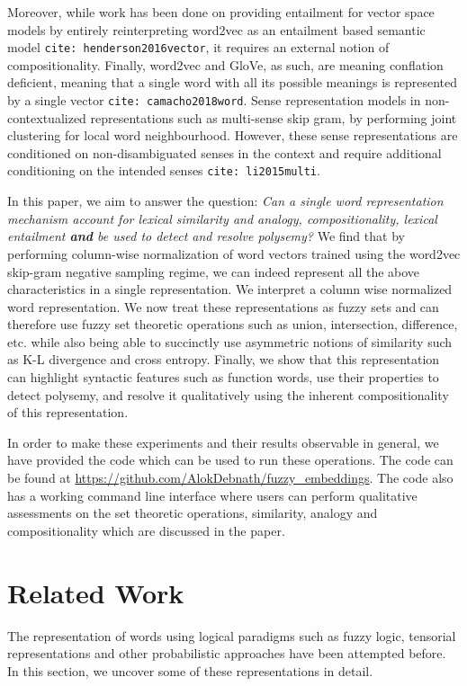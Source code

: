 \documentclass[11pt]{book}
\newcommand{\citep}[1]{\texttt{cite: #1}}
\begin{document}
Moreover, while work has been done on providing entailment for vector space
models by entirely reinterpreting word2vec as an entailment based semantic
model \citep{henderson2016vector}, it requires an external notion of
compositionality. Finally, word2vec and GloVe, as such, are meaning conflation
deficient, meaning that a single word with all its possible meanings is
represented by a single vector \citep{camacho2018word}. Sense representation
models in non-contextualized representations such as multi-sense skip gram, by
performing joint clustering for local word neighbourhood. However, these sense
representations are conditioned on non-disambiguated senses in the context and
require additional conditioning on the intended senses \citep{li2015multi}. 

In this paper, we aim to answer the question: \textit{Can a single word
representation mechanism account for lexical similarity and analogy,
compositionality, lexical entailment \textbf{and} be used to detect and resolve
polysemy?} We find that by performing column-wise normalization of word vectors
trained using the word2vec skip-gram negative sampling regime, we can indeed
represent all the above characteristics in a single representation. We
interpret a column wise normalized word representation. We now treat these
representations as fuzzy sets and can therefore use fuzzy set theoretic
operations such as union, intersection, difference, etc. while also being able
to succinctly use asymmetric notions of similarity such as K-L divergence and
cross entropy. Finally, we show that this representation can highlight
syntactic features such as function words, use their properties to detect
polysemy, and resolve it qualitatively using the inherent compositionality of
this representation.

In order to make these experiments and their results observable in general, we
have provided the code which can be used to run these operations. The code can
be found at \url{https://github.com/AlokDebnath/fuzzy_embeddings}. The code
also has a working command line interface where users can perform qualitative
assessments on the set theoretic operations, similarity, analogy and
compositionality which are discussed in the paper.

\section{Related Work} \label{sec: related}

The representation of words using logical paradigms such as fuzzy logic,
tensorial representations and other probabilistic approaches have been
attempted before. In this section, we uncover some of these representations in
detail. 
\end{document}
